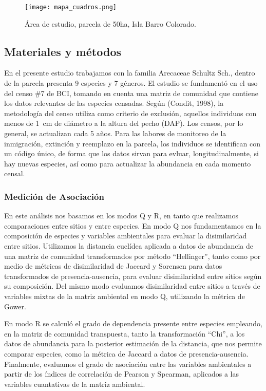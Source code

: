 \documentclass[11pt,]{article}
\begin{document}
\begin{figure}
\centering
\texttt{[image: mapa\_cuadros.png]}
\caption{Área de estudio, parcela de 50ha, Isla Barro Colorado.
\label{fig:mapa_cuadros}}
\end{figure}

\subsection{Materiales y métodos}\label{materiales-y-muxe9todos}

En el presente estudio trabajamos con la familia Arecaceae Schultz Sch.,
dentro de la parcela presenta 9 especies y 7 géneros. El estudio se
fundamentó en el uso del censo \#7 de BCI, tomando en cuenta una matriz
de comunidad que contiene los datos relevantes de las especies censadas.
Según (Condit, 1998), la metodología del censo utiliza como criterio de
exclusión, aquellos individuos con menos de 1~cm de diámetro a la altura
del pecho (DAP). Los censos, por lo general, se actualizan cada 5 años.
Para las labores de monitoreo de la inmigración, extinción y reemplazo
en la parcela, los individuos se identifican con un código único, de
forma que los datos sirvan para evluar, longitudinalmente, si hay nuevas
especies, así como para actualizar la abundancia en cada momento censal.

\subsubsection{Medición de
Asociación}\label{mediciuxf3n-de-asociaciuxf3n}

En este análisis nos basamos en los modos Q y R, en tanto que realizamos
comparaciones entre sitios y entre especies. En modo Q nos fundamentamos
en la composición de especies y variables ambientales para evaluar la
disimilaridad entre sitios. Utilizamos la distancia euclídea aplicada a
datos de abundancia de una matriz de comunidad transformados por método
``Hellinger'', tanto como por medio de métricas de disimilaridad de
Jaccard y Sorensen para datos transformados de presencia-ausencia, para
evaluar disimilaridad entre sitios según su composición. Del mismo modo
evaluamos disimilaridad entre sitios a través de variables mixtas de la
matriz ambiental en modo Q, utilizando la métrica de Gower.

En modo R se calculó el grado de dependencia presente entre especies
empleando, en la matriz de comunidad transpuesta, tanto la
transformación ``Chi'', a los datos de abundancia para la posterior
estimación de la distancia, que nos permite comparar especies, como la
métrica de Jaccard a datos de presencia-ausencia. Finalmente, evaluamos
el grado de asociación entre las variables ambientales a partir de los
índices de correlación de Pearson y Spearman, aplicados a las variables
cuantativas de la matriz ambiental.
\end{document}
